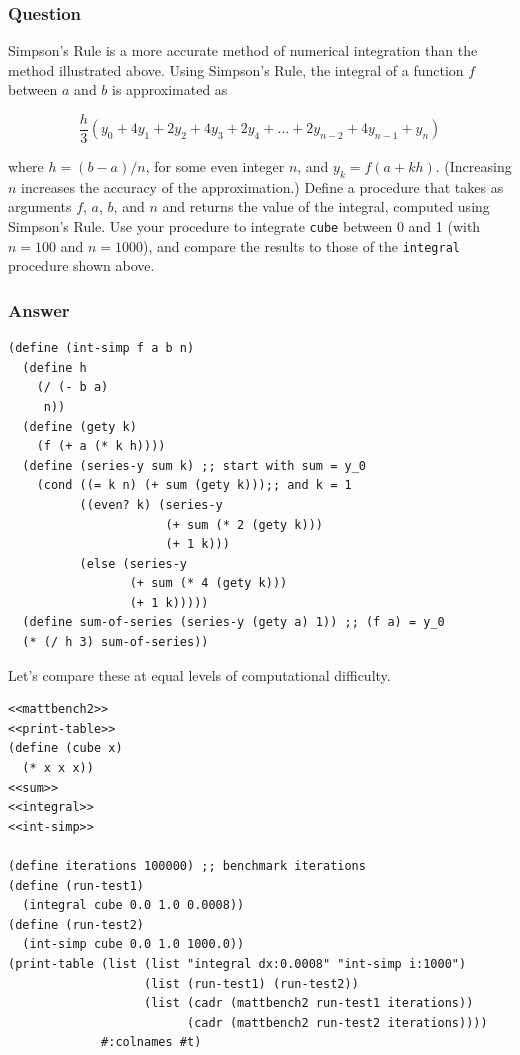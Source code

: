 \documentclass[final,fleqn,titlepage,twoside]{article}
\begin{document}
\subsubsection{Question}
\label{sec:org21caae2}
Simpson's Rule is a more accurate method of numerical integration than the
method illustrated above. Using Simpson's Rule, the integral of a function \(f\)
between \(a\) and \(b\) is approximated as

\[
\frac{h}{3}(y_0 + 4y_1 + 2y_2 + 4y_3 + 2y_4 + \dots + 2y_{n-2} + 4y_{n-1} + y_n)
\]

where \(h = (b - a) / n\), for some even integer \(n\), and \(y_k = f(a + kh)\).
(Increasing \(n\) increases the accuracy of the approximation.) Define a
procedure that takes as arguments \(f\), \(a\), \(b\), and \(n\) and returns the
value of the integral, computed using Simpson's Rule. Use your procedure to
integrate \texttt{cube} between 0 and 1 (with \(n = 100\) and \(n = 1000\)),
and compare the results to those of the \texttt{integral} procedure shown
above.

\subsubsection{Answer}
\label{sec:orgf6f7746}
\begin{verbatim}
(define (int-simp f a b n)
  (define h
    (/ (- b a)
     n))
  (define (gety k)
    (f (+ a (* k h))))
  (define (series-y sum k) ;; start with sum = y_0
    (cond ((= k n) (+ sum (gety k)));; and k = 1
          ((even? k) (series-y
                      (+ sum (* 2 (gety k)))
                      (+ 1 k)))
          (else (series-y
                 (+ sum (* 4 (gety k)))
                 (+ 1 k)))))
  (define sum-of-series (series-y (gety a) 1)) ;; (f a) = y_0
  (* (/ h 3) sum-of-series))
\end{verbatim}

Let's compare these at equal levels of computational difficulty.
\begin{verbatim}
<<mattbench2>>
<<print-table>>
(define (cube x)
  (* x x x))
<<sum>>
<<integral>>
<<int-simp>>

(define iterations 100000) ;; benchmark iterations
(define (run-test1)
  (integral cube 0.0 1.0 0.0008))
(define (run-test2)
  (int-simp cube 0.0 1.0 1000.0))
(print-table (list (list "integral dx:0.0008" "int-simp i:1000")
                   (list (run-test1) (run-test2))
                   (list (cadr (mattbench2 run-test1 iterations))
                         (cadr (mattbench2 run-test2 iterations))))
             #:colnames #t)
\end{verbatim}
\end{document}
